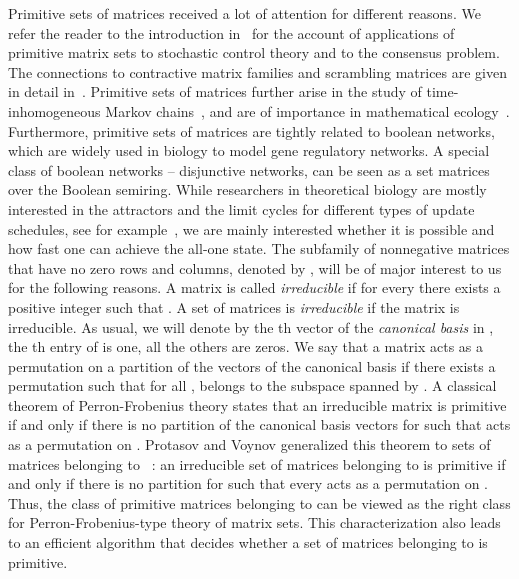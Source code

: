 \documentclass[a4paper,USenglish]{lipics}
\theoremstyle{definition}
\begin{document}
Primitive sets of matrices received a lot of attention for different reasons. We refer the reader to the introduction in~\cite{BJO15} for the account of applications of primitive matrix sets to stochastic control theory and to the consensus problem. The connections to contractive matrix families and scrambling matrices are given in detail in~\cite[Section 5]{PrVo2012}. Primitive sets of matrices further arise in the study of time-inhomogeneous Markov chains~\cite{Hart02}, and are of importance in mathematical ecology~\cite{Log10}.
Furthermore, primitive sets of matrices are tightly related to boolean networks, which are widely used in biology to model gene regulatory networks. A special class of boolean networks -- disjunctive networks, can be seen as a set matrices over the Boolean semiring.
While researchers in theoretical biology are mostly interested in the attractors and the limit cycles for different types of update schedules, see for example~\cite{GoNo12}, we are mainly interested whether it is possible and how fast one can achieve the all-one state. 
The subfamily of nonnegative matrices that have no zero rows and columns, denoted by , will be of major interest to us for the following reasons. A matrix  is called \emph{irreducible} if for every  there exists a positive integer  such that . A set of  matrices  is \emph{irreducible} if the matrix  is irreducible. As usual, we will denote by  the th vector of the \emph{canonical basis} in , the th entry of  is one, all the others are zeros. We say that a matrix  acts as a permutation on a partition  of the vectors of the canonical basis if there exists a permutation  such that for all ,  belongs to the subspace spanned by . A classical theorem of Perron-Frobenius theory states that an irreducible matrix  is primitive if and only if there is no partition  of the canonical basis vectors for  such that  acts as a permutation on . Protasov and Voynov generalized this theorem to sets of matrices belonging to ~\cite{PrVo2012}: an irreducible set of matrices belonging to  is primitive if and only if there is no partition  for  such that every  acts as a permutation on . Thus, the class of primitive matrices belonging to  can be viewed as the right class for Perron-Frobenius-type theory of matrix sets. This characterization also leads to an efficient algorithm that decides whether a set of matrices belonging to  is primitive.
\end{document}
